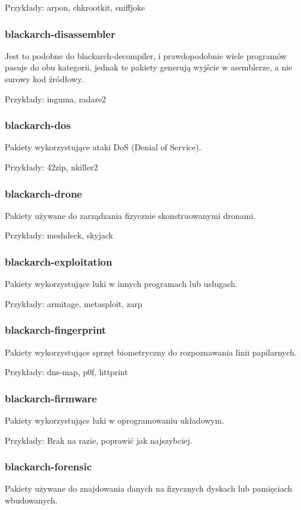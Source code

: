 \documentclass[a4paper, oneside, 11pt]{book}
\begin{document}
Przykłady: arpon, chkrootkit, sniffjoke

\subsubsection{blackarch-disassembler}
Jest to podobne do blackarch-decompiler, i prawdopodobnie wiele programów pasuje do obu kategorii, jednak te pakiety generują wyjście w asemblerze, a nie surowy kod źródłowy.

Przykłady: inguma, radare2

\subsubsection{blackarch-dos}
Pakiety wykorzystujące ataki DoS (Denial of Service).

Przykłady: 42zip, nkiller2

\subsubsection{blackarch-drone}
Pakiety używane do zarządzania fizycznie skonstruowanymi dronami.

Przykłady: meshdeck, skyjack

\subsubsection{blackarch-exploitation}
Pakiety wykorzystujące luki w innych programach lub usługach.

Przykłady: armitage, metasploit, zarp

\subsubsection{blackarch-fingerprint}
Pakiety wykorzystujące sprzęt biometryczny do rozpoznawania linii papilarnych.

Przykłady: dns-map, p0f, httprint

\subsubsection{blackarch-firmware}
Pakiety wykorzystujące luki w oprogramowaniu układowym.

Przykłady: Brak na razie, poprawić jak najszybciej.

\subsubsection{blackarch-forensic}
Pakiety używane do znajdowania danych na fizycznych dyskach lub pamięciach wbudowanych.
\end{document}

